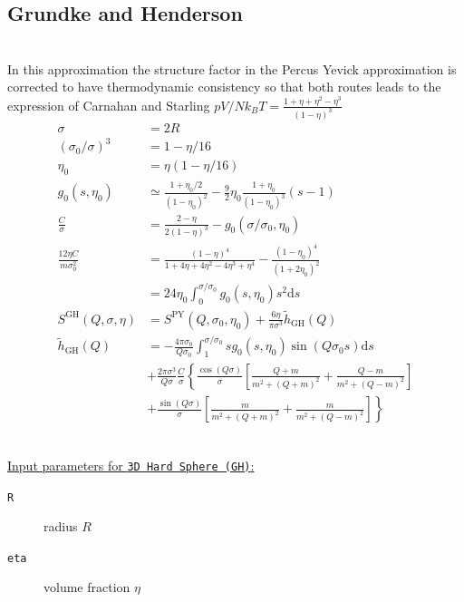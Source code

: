 \clearpage
\subsection{Grundke and Henderson} ~\\

\noindent In this approximation the structure factor in the Percus Yevick approximation is corrected to have thermodynamic consistency \cite{Henderson1975} so that both routes leads to the expression of Carnahan and Starling
$pV/Nk_BT=\frac{1+\eta+\eta^2-\eta^3}{\left(1-\eta\right)^3}$
\begin{align}
\sigma &= 2R\\
\left(\sigma_0/\sigma\right)^3 &= 1-\eta/16\\
\eta_0 &= \eta (1-\eta/16) \\
g_0(s,\eta_0) &\simeq \frac{1+\eta_0/2}{\left(1-\eta_0\right)^2} - \frac{9}{2}\eta_0\frac{1+\eta_0}{\left(1-\eta_0\right)^3}(s-1) \\
\frac{C}{\sigma} &= \frac{2-\eta}{2(1-\eta)^3} - g_0(\sigma/\sigma_0,\eta_0) \\
\frac{12\eta C}{m\sigma_0^2} &= \frac{(1-\eta)^4}{1+4\eta+4\eta^2-4\eta^3+\eta^4} - \frac{(1-\eta_0)^4}{(1+2\eta_0)^2} \nonumber \\
&= 24\eta_0\int_0^{\sigma/\sigma_0} g_0(s,\eta_0)s^2 \mathrm{d}s \\
S^\mathrm{GH}(Q,\sigma,\eta) &= S^\mathrm{PY}(Q,\sigma_0,\eta_0) + \frac{6\eta}{\pi\sigma^3}\tilde{h}_\mathrm{GH}(Q) \\
\tilde{h}_\mathrm{GH}(Q)  &= -\frac{4\pi\sigma_0}{Q\sigma_0} \int_1^{\sigma/\sigma_0} sg_0(s,\eta_0)\sin(Q\sigma_0 s)\mathrm{d}s\\
&+ \frac{2\pi\sigma^3}{Q\sigma}\frac{C}{\sigma} \left\{ \frac{\cos (Q\sigma)}{\sigma}\left[\frac{Q+m}{m^2+(Q+m)^2}+\frac{Q-m}{m^2+(Q-m)^2}\right]\right.\nonumber \\
& + \left. \frac{\sin (Q\sigma)}{\sigma}\left[\frac{m}{m^2+(Q+m)^2}+\frac{m}{m^2+(Q-m)^2}\right]\right\}\nonumber
\end{align}

\vspace{5mm}

\hspace{1pt}\\
\underline{Input parameters for \texttt{3D Hard Sphere (GH)}:}
\begin{description}
    \item[\texttt{R}]  radius $R$
    \item[\texttt{eta}] volume fraction $\eta$
\end{description}

